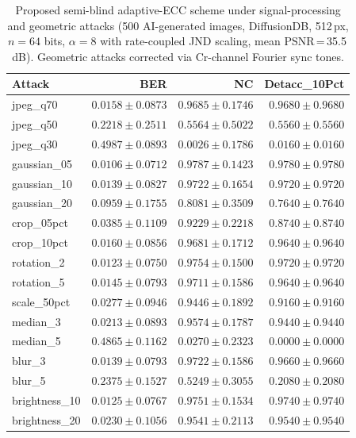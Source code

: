 \begin{table}[t]
  \centering
  \caption{Proposed semi-blind adaptive-ECC scheme under signal-processing and geometric attacks (500 AI-generated images, DiffusionDB, 512\,px, $n=64$ bits, $\alpha=8$ with rate-coupled JND scaling, mean PSNR\,=\,35.5\,dB). Geometric attacks corrected via Cr-channel Fourier sync tones.}
  \label{tab:full}
  \begin{tabular}{lrrr}
    \toprule
    Attack & BER & NC & Detacc\_10Pct \\
    \midrule
    jpeg\_q70 & $0.0158 \pm 0.0873$ & $0.9685 \pm 0.1746$ & $0.9680 \pm 0.9680$ \\
    jpeg\_q50 & $0.2218 \pm 0.2511$ & $0.5564 \pm 0.5022$ & $0.5560 \pm 0.5560$ \\
    jpeg\_q30 & $0.4987 \pm 0.0893$ & $0.0026 \pm 0.1786$ & $0.0160 \pm 0.0160$ \\
    gaussian\_05 & $0.0106 \pm 0.0712$ & $0.9787 \pm 0.1423$ & $0.9780 \pm 0.9780$ \\
    gaussian\_10 & $0.0139 \pm 0.0827$ & $0.9722 \pm 0.1654$ & $0.9720 \pm 0.9720$ \\
    gaussian\_20 & $0.0959 \pm 0.1755$ & $0.8081 \pm 0.3509$ & $0.7640 \pm 0.7640$ \\
    crop\_05pct & $0.0385 \pm 0.1109$ & $0.9229 \pm 0.2218$ & $0.8740 \pm 0.8740$ \\
    crop\_10pct & $0.0160 \pm 0.0856$ & $0.9681 \pm 0.1712$ & $0.9640 \pm 0.9640$ \\
    rotation\_2 & $0.0123 \pm 0.0750$ & $0.9754 \pm 0.1500$ & $0.9720 \pm 0.9720$ \\
    rotation\_5 & $0.0145 \pm 0.0793$ & $0.9711 \pm 0.1586$ & $0.9640 \pm 0.9640$ \\
    scale\_50pct & $0.0277 \pm 0.0946$ & $0.9446 \pm 0.1892$ & $0.9160 \pm 0.9160$ \\
    median\_3 & $0.0213 \pm 0.0893$ & $0.9574 \pm 0.1787$ & $0.9440 \pm 0.9440$ \\
    median\_5 & $0.4865 \pm 0.1162$ & $0.0270 \pm 0.2323$ & $0.0000 \pm 0.0000$ \\
    blur\_3 & $0.0139 \pm 0.0793$ & $0.9722 \pm 0.1586$ & $0.9660 \pm 0.9660$ \\
    blur\_5 & $0.2375 \pm 0.1527$ & $0.5249 \pm 0.3055$ & $0.2080 \pm 0.2080$ \\
    brightness\_10 & $0.0125 \pm 0.0767$ & $0.9751 \pm 0.1534$ & $0.9740 \pm 0.9740$ \\
    brightness\_20 & $0.0230 \pm 0.1056$ & $0.9541 \pm 0.2113$ & $0.9540 \pm 0.9540$ \\

\end{tabular}
\end{table}
